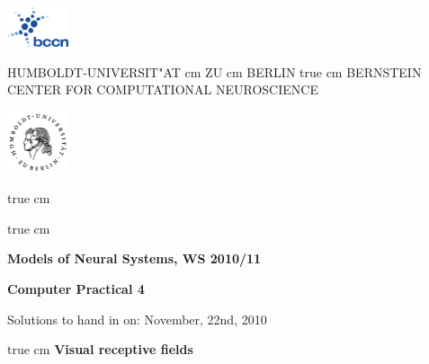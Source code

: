 \documentclass[12pt, a4]{article}
\begin{document}
\parbox{2cm}{
\includegraphics[width=1.8cm]{bccnlogo.pdf}
}
\parbox{11cm}{
\begin{center}
\large HUMBOLDT-UNIVERSIT"AT  cm ZU  cm BERLIN
 true cm
\mgross BERNSTEIN CENTER FOR COMPUTATIONAL NEUROSCIENCE
\end{center}
}
\parbox{2cm}
{
\hfill
\includegraphics[width=1.8cm]{hublogo.pdf}
}

 true cm



 true cm
\centerline{\bf Models of Neural Systems, WS 2010/11}
\centerline{\bf Computer Practical 4}
\centerline{Solutions to hand in on: November, 22nd, 2010}

 true cm
{\bf Visual receptive fields}

\medskip
\end{document}
